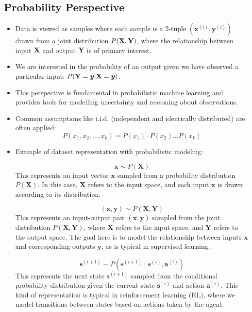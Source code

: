 \subsection{Probability Perspective}
\begin{itemize}
    \item Data is viewed as samples where each sample is a 2-tuple $(\bm{x}^{(i)}, \bm{y}^{(i)})$ drawn from a joint distribution $P(\mathbf{X},\mathbf{Y})$, where the relationship between input $\mathbf{X}$ and output $\mathbf{Y}$ is of primary interest.
    \item We are interested in the probability of an output given we have observed a particular input: $P(\mathbf{Y}=\bm{y} | \mathbf{X}=\bm{y})$.
    \item This perspective is fundamental in probabilistic machine learning and provides tools for modelling uncertainty and reasoning about observations.
    \item Common assumptions like i.i.d. (independent and identically distributed) are often applied:
          \[
              P(x_1, x_2, \dots, x_k) = P(x_1) \cdot P(x_2) \dots P(x_k)
          \]
    \item Example of dataset representation with probabilistic modeling:

          \[
              \bm{x} \sim P(\mathbf{X})
          \]
          This represents an input vector $\bm{x}$ sampled from a probability distribution $P(\mathbf{X})$. In this case, $\mathbf{X}$ refers to the input space, and each input $\bm{x}$ is drawn according to its distribution.


          \[
              (\bm{x}, \bm{y}) \sim P(\mathbf{X}, \mathbf{Y})
          \]
          This represents an input-output pair $(\bm{x}, \bm{y})$ sampled from the joint distribution $P(\mathbf{X}, \mathbf{Y})$, where $\mathbf{X}$ refers to the input space, and $\mathbf{Y}$ refers to the output space. The goal here is to model the relationship between inputs $\bm{x}$ and corresponding outputs $\bm{y}$, as is typical in supervised learning.

          \[
              \bm{s}^{(i+1)} \sim P(\bm{s}^{(i+1)} \mid \bm{s}^{(i)}, \bm{a}^{(i)})
          \]
          This represents the next state $\bm{s}^{(i+1)}$ sampled from the conditional probability distribution given the current state $\bm{s}^{(i)}$ and action $\bm{a}^{(i)}$. This kind of representation is typical in reinforcement learning (RL), where we model transitions between states based on actions taken by the agent.

\end{itemize}



